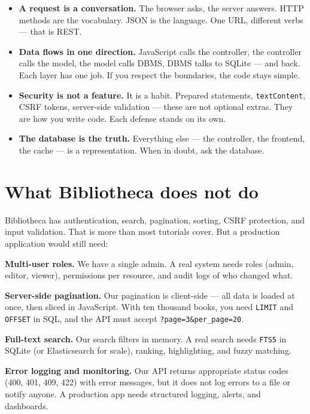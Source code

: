 \documentclass[11pt,a4paper,oneside]{book}
\providecommand{\tightlist}{%
  \setlength{\itemsep}{0pt}\setlength{\parskip}{0pt}}
\begin{document}
\begin{itemize}
\tightlist
\item
  \textbf{A request is a conversation.} The browser asks, the
  server answers. HTTP methods are the vocabulary. JSON is the
  language. One URL, different verbs --- that is REST.
\item
  \textbf{Data flows in one direction.} JavaScript calls the
  controller, the controller calls the model, the model calls
  DBMS, DBMS talks to SQLite --- and back. Each layer has one
  job. If you respect the boundaries, the code stays simple.
\item
  \textbf{Security is not a feature.} It is a habit. Prepared
  statements, \texttt{textContent}, CSRF tokens, server-side
  validation --- these are not optional extras. They are how you
  write code. Each defense stands on its own.
\item
  \textbf{The database is the truth.} Everything else --- the
  controller, the frontend, the cache --- is a representation.
  When in doubt, ask the database.
\end{itemize}

\hypertarget{what-bibliotheca-does-not-do}{%
\section{What Bibliotheca does not
do}\label{what-bibliotheca-does-not-do}}

Bibliotheca has authentication, search, pagination, sorting, CSRF
protection, and input validation. That is more than most
tutorials cover. But a production application would still need:

\textbf{Multi-user roles.} We have a single admin. A real system
needs roles (admin, editor, viewer), permissions per resource,
and audit logs of who changed what.

\textbf{Server-side pagination.} Our pagination is client-side
--- all data is loaded at once, then sliced in JavaScript. With
ten thousand books, you need \texttt{LIMIT} and \texttt{OFFSET}
in SQL, and the API must accept \texttt{?page=3\&per\_page=20}.

\textbf{Full-text search.} Our search filters in memory. A real
search needs \texttt{FTS5} in SQLite (or Elasticsearch for
scale), ranking, highlighting, and fuzzy matching.

\textbf{Error logging and monitoring.} Our API returns
appropriate status codes (400, 401, 409, 422) with error
messages, but it does not log errors to a file or notify anyone.
A production app needs structured logging, alerts, and
dashboards.
\end{document}
